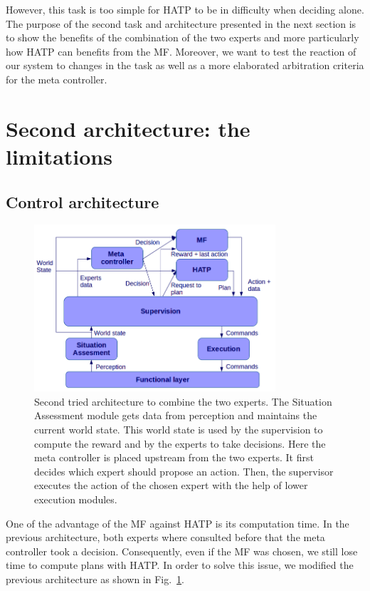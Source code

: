 \documentclass[english,a4paper,11pt,twoside]{StyleThese}
\begin{document}
However, this task is too simple for HATP to be in difficulty when deciding alone. The purpose of the second task and architecture presented in the next section is to show the benefits of the combination of the two experts and more particularly how HATP can benefits from the MF. Moreover, we want to test the reaction of our system to changes in the task as well as a more elaborated arbitration criteria for the meta controller.


\section{Second architecture: the limitations}

\subsection{Control architecture}

\begin{figure}[!h]
	\centering
    \includegraphics[width=0.8\textwidth]{figs/Chapter7/SecondArchi.png}
    \caption{Second tried architecture to combine the two experts. The Situation Assessment module gets data from perception and maintains the current world state. This world state is used by the supervision to compute the reward and by the experts to take decisions. Here the meta controller is placed upstream from the two experts. It first decides which expert should propose an action. Then, the supervisor executes the action of the chosen expert with the help of lower execution modules.}
    \label{fig:SecondArchi}
\end{figure}

One of the advantage of the MF against HATP is its computation time. In the previous architecture, both experts where consulted before that the meta controller took a decision. Consequently, even if the MF was chosen, we still lose time to compute plans with HATP. In order to solve this issue, we modified the previous architecture as shown in Fig.~\ref{fig:SecondArchi}. 
\end{document}
